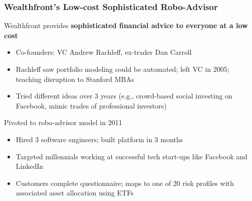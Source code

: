 \documentclass[aspectratio=169]{beamer}
\begin{document}
\begin{frame}
\frametitle{Wealthfront's Low-cost Sophisticated Robo-Advisor}


\vspace{-2mm}
Wealthfront provides \textbf{sophisticated financial advice to everyone at a low cost}

\begin{itemize}
        \item Co-founders: VC Andrew Rachleff, ex-trader Dan Carroll
        \item Rachleff saw portfolio modeling could be automated; left VC in 2005; teaching disruption to Stanford MBAs
        \item Tried different ideas over 3 years (e.g., crowd-based social investing on Facebook, mimic trades of professional investors)
\end{itemize}

\smallskip 

Pivoted to robo-advisor model in 2011
\begin{itemize}
    \item Hired 3 software engineers; built platform in 3 months
    \item Targeted millennials working at successful tech start-ups like Facebook and LinkedIn
    \item Customers complete questionnaire; maps to one of 20 risk profiles with associated asset allocation using ETFs 
\end{itemize}



\end{frame} 
\end{document}
